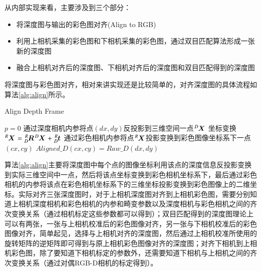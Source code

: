 从内部实现来看，主要涉及到三个部分：
\begin{itemize}
\item 将深度图与输出的彩色图对齐(Align to RGB)
\item 利用上相机采集的彩色图和下相机采集的彩色图，通过双目匹配算法形成一张新的深度图
\item 融合上相机对齐后的深度图、下相机对齐后的深度图和双目匹配得到的深度图
\end{itemize}
将深度图与彩色图对齐，相对来讲实现还是比较简单的，对齐深度图的具体流程如算法\ref{alg:align}所示。
\begin{algorithm}[!ht]
  \caption{Align Depth Frame}
  \label{alg:align}
   {
    $p = 0$
  }
   {
     {
      通过深度相机内参将点$(dx, dy)$反投影到三维空间一点$\tensor*[^D]{\bm{X}}{}$\;
      坐标变换$\tensor*[^R]{\bm{X}}{} = \tensor*[^R_D]{\bm{R}}{}\tensor*[^D]{\bm{X}}{} + \tensor*[^R_D]{\bm{t}}{}$\;
      通过彩色相机内参将点$\tensor*[^R]{\bm{X}}{}$投影变换到彩色图像坐标系下一点$(cx, cy)$\;
      \If {cx in $(0, cw]$ and cy in $(0, ch]$} {
        $Aligned\_D(cx, cy) = Raw\_D(dx, dy)$\;
      }
    }
  }
\end{algorithm}
算法\ref{alg:align}主要将深度图中每个点的图像坐标利用该点的深度信息反投影变换到实际三维空间中一点，然后将该点坐标变换到彩色相机坐标系下，最后通过彩色相机的内参将该点在彩色相机坐标系下的三维坐标投影变换到彩色图像上的二维坐标。实际对齐三张深度图时，对于上相机深度图对齐到上相机彩色图，需要分别知道上相机深度相机和彩色相机的内参和畸变参数以及深度相机与彩色相机之间的齐次变换关系（通过相机标定这些参数都可以得到）；双目匹配得到的深度图理论上可以有两张，一张与上相机校准后的彩色图像对齐，另一张与下相机校准后的彩色图像对齐，简单起见，选择与上相机对齐的深度图，然后通过上相机校准所使用的旋转矩阵的逆矩阵即可得到与原上相机彩色图像对齐的深度图；对齐下相机到上相机彩色图，除了要知道下相机标定的参数外，还需要知道下相机与上相机之间的齐次变换关系（通过对偶RGB-D相机的标定得到）。

